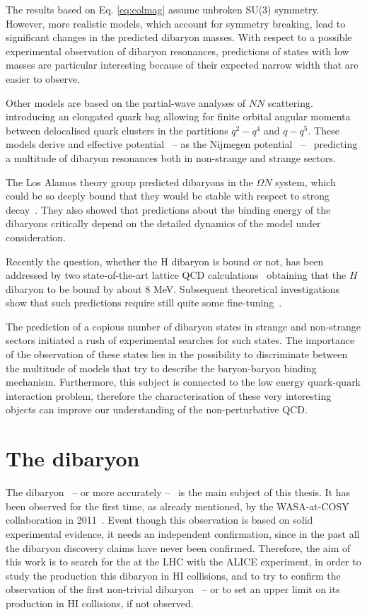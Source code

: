 The results based on Eq. \ref{eq:colmag} assume unbroken SU(3) symmetry.
However, more realistic models, which account for symmetry breaking, lead to significant changes
in the predicted dibaryon masses.
With respect to a possible experimental observation of dibaryon resonances, predictions of states
with low masses are particular interesting because of their expected narrow width that are easier
to observe.

Other models are based on the partial-wave analyses of $NN$ scattering.
introducing an elongated quark bag allowing for finite orbital angular momenta between
delocalised quark clusters in the partitions $q^{2}-q^{4}$ and $q-q^{5}$. 
These models derive and effective potential \ -- as the Nijmegen 
potential~\cite{dibpred1,dibpred2,dibpred3} -- \ predicting a multitude of dibaryon resonances
both in non-strange and strange sectors. 

The Los Alamos theory group predicted dibaryons in the $\Omega N$ system, which could be so
deeply bound that they would be stable with respect to strong 
decay~\cite{dsinevitable1,dsinevitable2}.
They also showed that predictions about the binding energy of the dibaryons critically depend
on the detailed dynamics of the model under consideration.

Recently the question, whether the H dibaryon is bound or not, has been addressed by two 
state-of-the-art lattice QCD calculations~\cite{Hlattice1,Hlattice2} obtaining
that the $H$ dibaryon to be bound by about 8 MeV.
Subsequent theoretical investigations show that such predictions require still quite some
fine-tuning~\cite{Hlattice3}.

The prediction of a copious number of dibaryon states in strange and non-strange sectors 
initiated a rush of experimental searches for such states. 
The importance of the observation of these states lies in the possibility to discriminate
between the multitude of models that try to describe the baryon-baryon binding mechanism.
Furthermore, this subject is connected to the low energy quark-quark interaction problem,
therefore the characterisation of these very interesting objects can improve our 
understanding of the non-perturbative QCD.

%
%
\section{The \dst dibaryon} \label{sec:2.2}

The \ds dibaryon \ -- or more accurately \dst -- \ is the main subject of this thesis.
It has been observed for the first time, as already mentioned, by the WASA-at-COSY 
collaboration in 2011~\cite{wasa1}.
Event though this observation is based on solid experimental evidence, it needs an independent
confirmation, since in the past all the dibaryon discovery claims have never been confirmed.
Therefore, the aim of this work is to search for the \dst at the LHC with the ALICE
experiment, in order to study the production this dibaryon in HI collisions, and to
try to confirm the observation of the first non-trivial dibaryon \ -- or to set an
upper limit on its production in HI collisions, if not observed.

